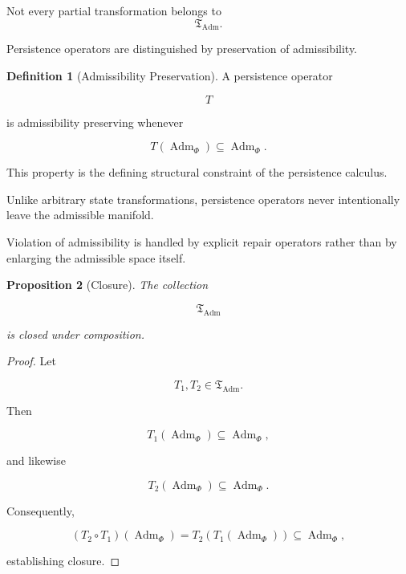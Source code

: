 \documentclass[11pt]{book}
\numberwithin{equation}{chapter}
\theoremstyle{definition}
\newtheorem{definition}{Definition}[chapter]
\theoremstyle{plain}
\newtheorem{proposition}[definition]{Proposition}
\begin{document}
Not every partial transformation belongs to
\[
\mathfrak T_{\operatorname{Adm}}.
\]

Persistence operators are distinguished by preservation of admissibility.

\begin{definition}[Admissibility Preservation]

A persistence operator

\[
T
\]

is admissibility preserving whenever

\[
T
\left(
\operatorname{Adm}_{\Phi}
\right)
\subseteq
\operatorname{Adm}_{\Phi}.
\]

\end{definition}

This property is the defining structural constraint of the persistence calculus.

Unlike arbitrary state transformations, persistence operators never intentionally leave the admissible manifold.

Violation of admissibility is handled by explicit repair operators rather than by enlarging the admissible space itself.

\begin{proposition}[Closure]

The collection

\[
\mathfrak T_{\operatorname{Adm}}
\]

is closed under composition.

\end{proposition}

\begin{proof}

Let

\[
T_1,
T_2
\in
\mathfrak T_{\operatorname{Adm}}.
\]

Then

\[
T_1
\left(
\operatorname{Adm}_{\Phi}
\right)
\subseteq
\operatorname{Adm}_{\Phi},
\]

and likewise

\[
T_2
\left(
\operatorname{Adm}_{\Phi}
\right)
\subseteq
\operatorname{Adm}_{\Phi}.
\]

Consequently,

\[
(T_2\circ T_1)
\left(
\operatorname{Adm}_{\Phi}
\right)
=
T_2
\left(
T_1
(
\operatorname{Adm}_{\Phi}
)
\right)
\subseteq
\operatorname{Adm}_{\Phi},
\]

establishing closure.

\end{proof}
\end{document}
